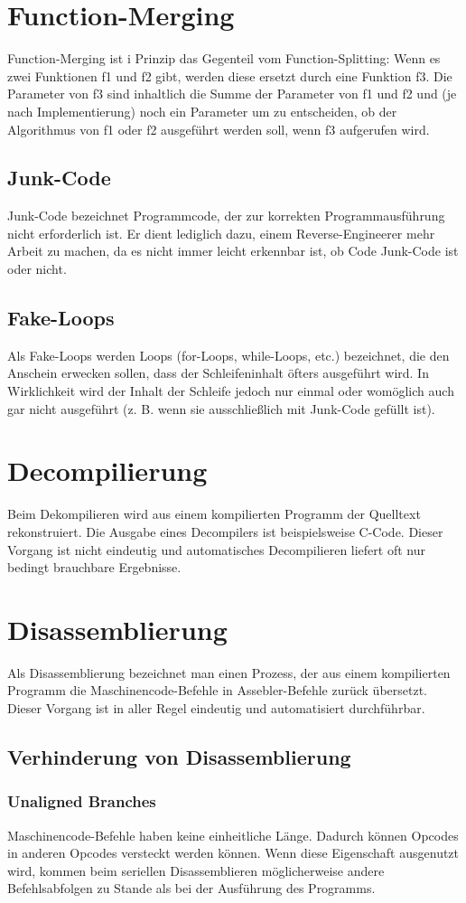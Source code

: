 \begin{multicols}{3}
\section{Function-Merging}
Function-Merging ist i Prinzip das Gegenteil vom Function-Splitting: Wenn es zwei Funktionen f1 und f2 gibt, werden diese ersetzt durch eine Funktion f3. Die Parameter von f3 sind inhaltlich die Summe der Parameter von f1 und f2 und (je nach Implementierung) noch ein Parameter um zu entscheiden, ob der Algorithmus von f1 oder f2 ausgeführt werden soll, wenn f3 aufgerufen wird.
\subsection{Junk-Code}
Junk-Code bezeichnet Programmcode, der zur korrekten Programmausführung nicht erforderlich ist. Er dient lediglich dazu, einem Reverse-Engineerer mehr Arbeit zu machen, da es nicht immer leicht erkennbar ist, ob Code Junk-Code ist oder nicht.
\subsection{Fake-Loops}
Als Fake-Loops werden Loops (for-Loops, while-Loops, etc.) bezeichnet, die den Anschein erwecken sollen, dass der Schleifeninhalt öfters ausgeführt wird. In Wirklichkeit wird der Inhalt der Schleife jedoch nur einmal oder womöglich auch gar nicht ausgeführt (z. B. wenn sie ausschließlich mit Junk-Code gefüllt ist).
\section{Decompilierung}
Beim Dekompilieren wird aus einem kompilierten Programm der Quelltext rekonstruiert. Die Ausgabe eines Decompilers ist beispielsweise C-Code. Dieser Vorgang ist nicht eindeutig und automatisches Decompilieren liefert oft nur bedingt brauchbare Ergebnisse.
\section{Disassemblierung}
Als Disassemblierung bezeichnet man einen Prozess, der aus einem kompilierten Programm die Maschinencode-Befehle in Assebler-Befehle zurück übersetzt. Dieser Vorgang ist in aller Regel eindeutig und automatisiert durchführbar.
\subsection{Verhinderung von Disassemblierung}
\subsubsection{Unaligned Branches}
Maschinencode-Befehle haben keine einheitliche Länge. Dadurch können Opcodes in anderen Opcodes versteckt werden können. Wenn diese Eigenschaft ausgenutzt wird, kommen beim seriellen Disassemblieren möglicherweise andere Befehlsabfolgen zu Stande als bei der Ausführung des Programms. 

\end{multicols}

